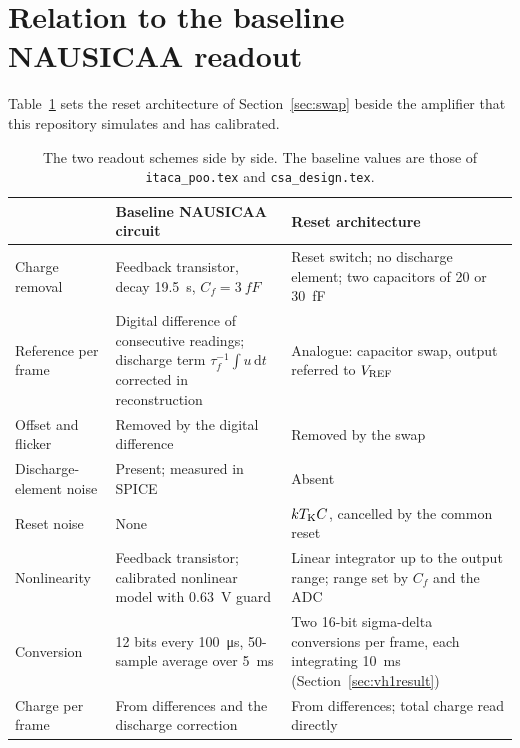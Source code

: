 \documentclass[11pt,a4paper]{article}
\newcommand{\dd}{\mathrm{d}}
\newcommand{\Cf}{\ensuremath{C_f}}
\newcommand{\Vref}{V_{\rm REF}}
\begin{document}
\section{Relation to the baseline NAUSICAA readout}
\label{sec:nausicaa}
%
Table~\ref{tab:compare} sets the reset architecture of
Section~\ref{sec:swap} beside the amplifier that this repository simulates
and has calibrated.
%
\begin{table}[htbp]\centering\small
\begin{tabular}{@{}p{34mm}p{58mm}p{58mm}@{}}
\toprule
 & Baseline NAUSICAA circuit & Reset architecture\\
\midrule
Charge removal & Feedback transistor, decay \SI{19.5}{s}, $\Cf=\SI{3}{fF}$ &
Reset switch; no discharge element; two capacitors of \SI{20}{} or
\SI{30}{fF}\\
Reference per frame & Digital difference of consecutive readings; discharge term
$\tau_f^{-1}\int u\,\dd t$ corrected in reconstruction & Analogue: capacitor
swap, output referred to $\Vref$\\
Offset and flicker & Removed by the digital difference & Removed by the swap\\
Discharge-element noise & Present; measured in SPICE & Absent\\
Reset noise & None & $kT_{\rm K}C$, cancelled by the common reset\\
Nonlinearity & Feedback transistor; calibrated nonlinear model with \SI{0.63}{V}
guard & Linear integrator up to the output range; range set by $\Cf$ and the
ADC\\
Conversion & 12 bits every \SI{100}{\micro s}, 50-sample average over \SI{5}{ms}
& Two 16-bit sigma-delta conversions per frame, each integrating
\SI{10}{ms} (Section~\ref{sec:vh1result})\\
Charge per frame & From differences and the discharge correction & From
differences; total charge read directly\\
\bottomrule
\end{tabular}
\caption{The two readout schemes side by side. The baseline values are those
of \texttt{itaca\_poo.tex} and \texttt{csa\_design.tex}.}
\label{tab:compare}
\end{table}
%
\end{document}
